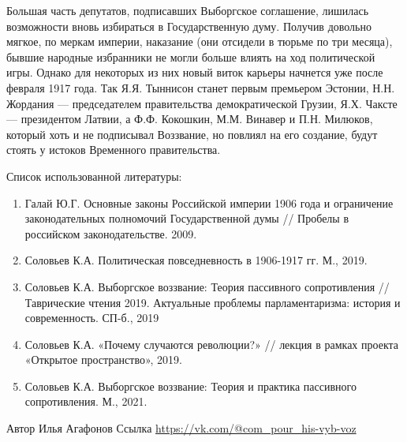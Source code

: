 Большая часть депутатов, подписавших Выборгское соглашение, лишилась возможности вновь избираться в Государственную думу. Получив довольно мягкое, по меркам империи, наказание (они отсидели в тюрьме по три месяца), бывшие народные избранники не могли больше влиять на ход политической игры.
Однако для некоторых из них новый виток карьеры начнется уже после февраля 1917 года. Так Я.Я. Тыннисон станет первым премьером Эстонии, Н.Н. Жордания — председателем правительства демократической Грузии, Я.Х. Чаксте — президентом Латвии, а Ф.Ф. Кокошкин, М.М. Винавер и П.Н. Милюков, который хоть и не подписывал Воззвание, но повлиял на его создание, будут стоять у истоков Временного правительства.

Список использованной литературы:
\begin{enumerate}
	\item Галай Ю.Г. Основные законы Российской империи 1906 года и ограничение законодательных полномочий Государственной думы // Пробелы в российском законодательстве. 2009.
	\item Соловьев К.А. Политическая повседневность в 1906-1917 гг. М., 2019.
	\item Соловьев К.А. Выборгское воззвание: Теория пассивного сопротивления // Таврические чтения 2019. Актуальные проблемы парламентаризма: история и современность. СП-б., 2019
	\item Соловьев К.А. «Почему случаются революции?» // лекция в рамках проекта «Открытое пространство», 2019.
	\item Соловьев К.А. Выборгское воззвание: Теория и практика пассивного сопротивления. М., 2021.
\end{enumerate}

Автор Илья Агафонов Ссылка \url{https://vk.com/@com_pour_his-vyb-voz}
